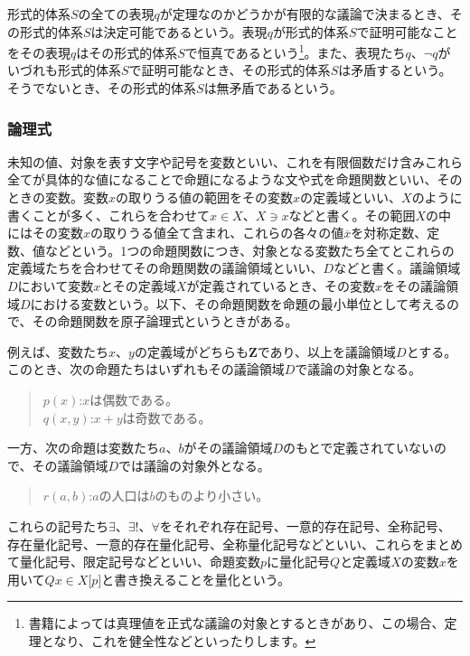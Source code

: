 \documentclass[a4paper]{jsarticle}
\begin{document}
\begin{dfn}
形式的体系$S$の全ての表現$q$が定理なのかどうかが有限的な議論で決まるとき、その形式的体系$S$は決定可能であるという。表現$q$が形式的体系$S$で証明可能なことをその表現$q$はその形式的体系$S$で恒真であるという\footnote{書籍によっては真理値を正式な議論の対象とするときがあり、この場合、定理となり、これを健全性などといったりします。}。また、表現たち$q$、$\neg q$がいづれも形式的体系$S$で証明可能なとき、その形式的体系$S$は矛盾するという。そうでないとき、その形式的体系$S$は無矛盾であるという。
\end{dfn}
\subsubsection{論理式}%
\begin{dfn}
未知の値、対象を表す文字や記号を変数といい、これを有限個数だけ含みこれら全てが具体的な値になることで命題になるような文や式を命題関数といい、そのときの変数。変数$x$の取りうる値の範囲をその変数$x$の定義域といい、$X$のように書くことが多く、これらを合わせて$x \in X$、$X \ni x$などと書く。その範囲$X$の中にはその変数$x$の取りうる値全て含まれ、これらの各々の値$\overline{x}$を対称定数、定数、値などという。1つの命題関数につき、対象となる変数たち全てとこれらの定義域たちを合わせてその命題関数の議論領域といい、$D$などと書く。議論領域$D$において変数$x$とその定義域$X$が定義されているとき、その変数$x$をその議論領域$D$における変数という。以下、その命題関数を命題の最小単位として考えるので、その命題関数を原子論理式というときがある。
\end{dfn}
例えば、変数たち$x$、$y$の定義域がどちらも$\mathbf{Z}$であり、以上を議論領域$D$とする。このとき、次の命題たちはいずれもその議論領域$D$で議論の対象となる。
\begin{quote}
$p(x)$:$x$は偶数である。\\
$q(x,y)$:$x + y$は奇数である。
\end{quote}
一方、次の命題は変数たち$a$、$b$がその議論領域$D$のもとで定義されていないので、その議論領域$D$では議論の対象外となる。
\begin{quote}
$r(a,b)$:$a$の人口は$b$のものより小さい。
\end{quote}
\begin{dfn}
これらの記号たち$\exists$、$\exists!$、$\forall$をそれぞれ存在記号、一意的存在記号、全称記号、存在量化記号、一意的存在量化記号、全称量化記号などといい、これらをまとめて量化記号、限定記号などといい、命題変数$p$に量化記号$Q$と定義域$X$の変数$x$を用いて$Qx \in X\lbrack p\rbrack$と書き換えることを量化という。
\end{dfn}
\end{document}

